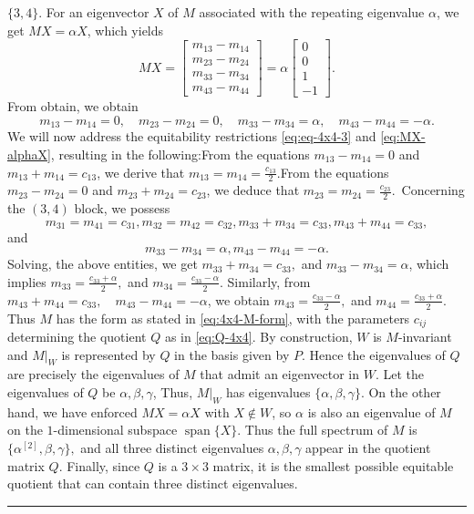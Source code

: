 \documentclass[12pt,twoside]{article}
\renewenvironment{proof}{{\noindent\bfseries Proof.}}{\qed}
\def\qed{\nolinebreak\hfill\rule{.2cm}{.2cm}\par\addvspace{.5cm}}
\begin{document}
\begin{proof}
	$\{3,4\}$. For an eigenvector $X$ of $M$ associated with the repeating eigenvalue $\alpha$, we get $M X = \alpha X$, which yields
	$$
	MX =
	\begin{bmatrix}
		m_{13} - m_{14}\\
		m_{23} - m_{24}\\
		m_{33} - m_{34}\\
		m_{43} - m_{44}
	\end{bmatrix}
	=
	\alpha
	\begin{bmatrix}
		0\\
		0\\
		1\\
		-1
	\end{bmatrix}.
	$$
	From  obtain, we obtain
	\begin{equation}\label{eq:MX-alphaX}
		m_{13}-m_{14}=0,\quad
		m_{23}-m_{24}=0,\quad
		m_{33}-m_{34}=\alpha,\quad
		m_{43}-m_{44}=-\alpha.
	\end{equation}
	We will now address the equitability restrictions \eqref{eq:eq-4x4-3} and \eqref{eq:MX-alphaX}, resulting in the following:From the equations $m_{13}-m_{14}=0$ and $m_{13}+m_{14}=c_{13}$, we derive that $m_{13}=m_{14}=\frac{c_{13}}{2}.$From the equations $m_{23}-m_{24}=0$ and $m_{23}+m_{24}=c_{23}$, we deduce that $m_{23}=m_{24}=\frac{c_{23}}{2}.$ Concerning the $(3,4)$ block, we possess
	$$ m_{31}=m_{41}=c_{31},
	m_{32}=m_{42}=c_{32},
	m_{33}+m_{34}=c_{33},
	m_{43}+m_{44}=c_{33},
	$$
	and
	$$
	m_{33}-m_{34}=\alpha,
	m_{43}-m_{44}=-\alpha.
	$$
	Solving, the above entities, we get $m_{33}+m_{34}=c_{33},$ and  $m_{33}-m_{34}=\alpha$, which implies $m_{33}=\frac{c_{33}+\alpha}{2},$ and $m_{34}=\frac{c_{33}-\alpha}{2}.$ Similarly, from
	$m_{43}+m_{44}=c_{33},\quad m_{43}-m_{44}=-\alpha$, 	we obtain $m_{43}=\frac{c_{33}-\alpha}{2},$ and $ m_{44}=\frac{c_{33}+\alpha}{2}.$ Thus $M$ has the form as stated in \eqref{eq:4x4-M-form}, with the parameters
	$c_{ij}$ determining the quotient $Q$ as in \eqref{eq:Q-4x4}.  By construction, $W$ is $M$-invariant and $M|_W$ is represented by $Q$ in the	basis given by $P$. Hence the eigenvalues of $Q$ are precisely the eigenvalues	of $M$ that admit an eigenvector in $W$. Let the eigenvalues of $Q$ be $\alpha,\beta,\gamma$,	Thus, $M|_W$ has eigenvalues $\{\alpha,\beta,\gamma\}$.  On the other hand, we have enforced $MX=\alpha X$ with $X\notin W$, so $\alpha$
	is also an eigenvalue of $M$ on the $1$-dimensional subspace
	$\operatorname{span}\{X\}$. Thus the full spectrum of $M$ is $ \{\alpha^{[2]},\beta,\gamma\},$	and all three distinct eigenvalues $\alpha,\beta,\gamma$ appear in the quotient matrix $Q$. Finally, since $Q$ is a $3\times 3$ matrix, it is the smallest possible	equitable quotient that can contain three distinct eigenvalues.
\end{proof}
\end{document}

